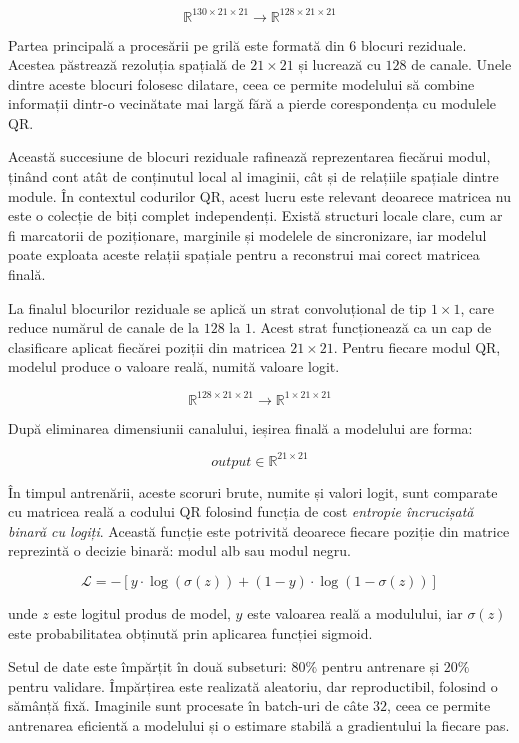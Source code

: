 \[
\mathbb{R}^{130 \times 21 \times 21}
\rightarrow
\mathbb{R}^{128 \times 21 \times 21}
\]

Partea principală a procesării pe grilă este formată din $6$ blocuri reziduale. Acestea păstrează rezoluția spațială de $21 \times 21$ și lucrează cu $128$ de canale. Unele dintre aceste blocuri folosesc dilatare, ceea ce permite modelului să combine informații dintr-o vecinătate mai largă fără a pierde corespondența cu modulele QR.

Această succesiune de blocuri reziduale rafinează reprezentarea fiecărui modul, ținând cont atât de conținutul local al imaginii, cât și de relațiile spațiale dintre module. În contextul codurilor QR, acest lucru este relevant deoarece matricea nu este o colecție de biți complet independenți. Există structuri locale clare, cum ar fi marcatorii de poziționare, marginile și modelele de sincronizare, iar modelul poate exploata aceste relații spațiale pentru a reconstrui mai corect matricea finală.

La finalul blocurilor reziduale se aplică un strat convoluțional de tip $1 \times 1$, care reduce numărul de canale de la $128$ la $1$. Acest strat funcționează ca un cap de clasificare aplicat fiecărei poziții din matricea $21 \times 21$. Pentru fiecare modul QR, modelul produce o valoare reală, numită valoare logit.

\[
\mathbb{R}^{128 \times 21 \times 21}
\rightarrow
\mathbb{R}^{1 \times 21 \times 21}
\]

După eliminarea dimensiunii canalului, ieșirea finală a modelului are forma:

\[
output \in \mathbb{R}^{21 \times 21}
\]

În timpul antrenării, aceste scoruri brute, numite și valori logit, sunt comparate cu matricea reală a codului QR folosind funcția de cost \textit{entropie încrucișată binară cu logiți}. Această funcție este potrivită deoarece fiecare poziție din matrice reprezintă o decizie binară: modul alb sau modul negru.

\[
\mathcal{L} =
- \left[
y \cdot \log(\sigma(z)) +
(1-y) \cdot \log(1-\sigma(z))
\right]
\]

unde $z$ este logitul produs de model, $y$ este valoarea reală a modulului, iar $\sigma(z)$ este probabilitatea obținută prin aplicarea funcției sigmoid.

Setul de date este împărțit în două subseturi: $80\%$ pentru antrenare și $20\%$ pentru validare. Împărțirea este realizată aleatoriu, dar reproductibil, folosind o sămânță fixă. Imaginile sunt procesate în batch-uri de câte $32$, ceea ce permite antrenarea eficientă a modelului și o estimare stabilă a gradientului la fiecare pas.

